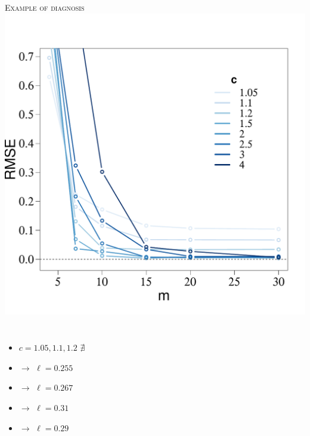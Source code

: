\documentclass[8pt]{beamer} %
\begin{document}
\begin{frame}

\textsc{\small Example of diagnosis}\\

\vspace{-4mm}
\centering
\includegraphics[scale=0.25, trim = 0mm 8mm 0mm 0mm, clip]{ch5_fig4_MSE_vs_J.pdf}

\vspace{2mm}
\begin{columns}
\begin{itemize}[<+->]\setlength\itemsep{4mm}
\small
\item[] $c=1.05,1.1,1.2$\; $\nexists$
\item[]  \; $\to$ \; $\hat{\ell}=0.255$
\item[]  \; $\to$ \; $\hat{\ell}=0.267$ 
\item[]  \; $\to$ \; $\hat{\ell}=0.31$
\item[]  \; $\to$ \; $\hat{\ell}=0.29$
\end{itemize}


\end{columns}
\end{frame}
\end{document}
